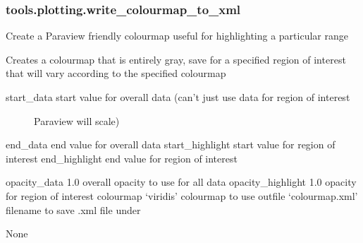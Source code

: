 \documentclass[letterpaper,10pt,english]{sphinxmanual}
\begin{document}
\subsubsection{tools.plotting.write\_colourmap\_to\_xml}
\label{\detokenize{_autosummary/tools.plotting.write_colourmap_to_xml:tools-plotting-write-colourmap-to-xml}}\label{\detokenize{_autosummary/tools.plotting.write_colourmap_to_xml::doc}}

\begin{fulllineitems}
\label{\detokenize{_autosummary/tools.plotting.write_colourmap_to_xml:tools.plotting.write_colourmap_to_xml}}
\sphinxAtStartPar
Create a Paraview friendly colourmap useful for highlighting a particular range

\sphinxAtStartPar
Creates a colourmap that is entirely gray, save for a specified region of interest that will vary according to the
specified colourmap
\begin{description}
\item[{start\_data                      start value for overall data (can’t just use data for region of interest \sphinxhyphen{}}] \leavevmode
\sphinxAtStartPar
Paraview will scale)

\end{description}

\sphinxAtStartPar
end\_data                        end value for overall data
start\_highlight                 start value for region of interest
end\_highlight                   end value for region of interest

\sphinxAtStartPar
opacity\_data        1.0                 overall opacity to use for all data
opacity\_highlight   1.0                 opacity for region of interest
colourmap           ‘viridis’           colourmap to use
outfile             ‘colourmap.xml’     filename to save .xml file under

\sphinxAtStartPar
None

\end{fulllineitems}
\end{document}
